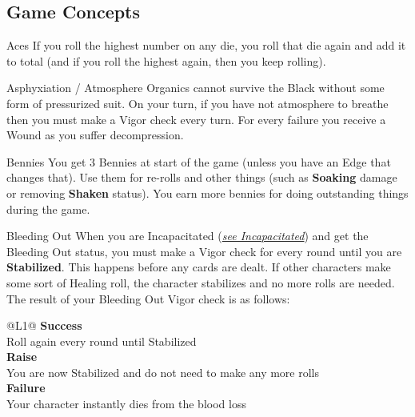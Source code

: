 \subsection{Game Concepts}
\label{sec:rules-concepts}

\begin{genericsection}{Aces}
If you roll the highest number on any die, you roll that die again and add it to total (and if you roll the highest again, then you keep rolling).
\end{genericsection}

\begin{genericsection}{Asphyxiation / Atmosphere}
Organics cannot survive the Black without some form of pressurized suit. On your turn, if you have not atmosphere to breathe then you must make a Vigor check every turn. For every failure you receive a Wound as you suffer decompression.
\end{genericsection}

\begin{genericsection}{Bennies}
You get 3 Bennies at start of the game (unless you have an Edge that changes that). Use them for re-rolls and other things (such as \textbf{Soaking} damage or removing \textbf{Shaken} status). You earn more bennies for doing outstanding things during the game.
\end{genericsection}

\begin{genericsection}{Bleeding Out}
When you are Incapacitated (\textit{\hyperref[sec:rules-concepts-incapacitated]{see Incapacitated}}) and get the Bleeding Out status, you must make a Vigor check for every round until you are \textbf{Stabilized}. This happens before any cards are dealt. If other characters make some sort of Healing roll, the character stabilizes and no more rolls are needed. The result of your Bleeding Out Vigor check is as follows:
\begin{redtable}{\linewidth}{@{}L{1}@{}}
  \textbf{Success} \\
  Roll again every round until Stabilized\\
  \textbf{Raise} \\
  You are now Stabilized and do not need to make any more rolls\\
  \textbf{Failure} \\
  Your character instantly dies from the blood loss\\
\end{redtable}
\end{genericsection}

